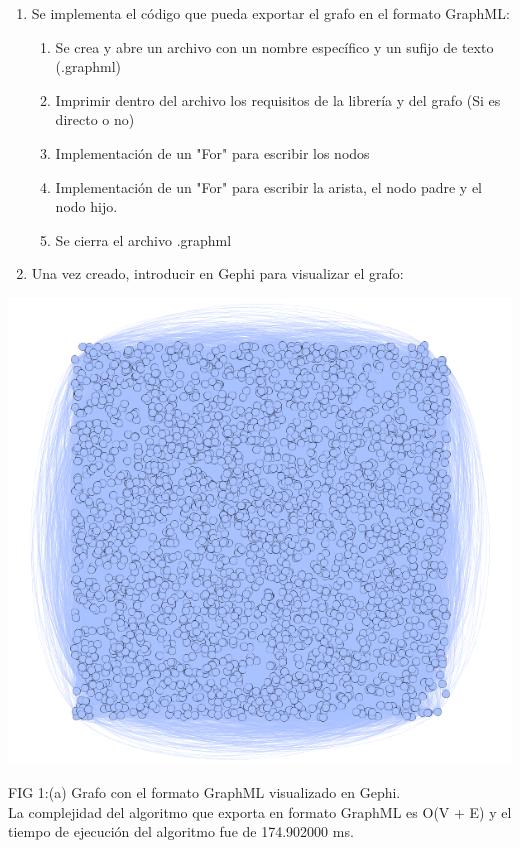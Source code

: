 \documentclass[book, 16 pt, conference]{ieeeconf}
\begin{document}
\begin{enumerate}
\item Se implementa el código que pueda exportar el grafo en el formato GraphML:
	\begin{enumerate}
	\item Se crea y abre un archivo con un nombre específico y un sufijo de texto (.graphml)
	\item Imprimir dentro del archivo los requisitos de la librería y del grafo (Si es directo o no)
	\item Implementación de un "For" para escribir los nodos
	\item Implementación de un "For" para escribir la arista, el nodo padre y el nodo hijo.
	\item Se cierra el archivo .graphml
	\end{enumerate}
\item Una vez creado, introducir en Gephi para visualizar el grafo: \\
\end{enumerate} 

\begin{center}
\includegraphics[scale=0.30]{1} 
\end{center}
FIG 1:(a) Grafo con el formato GraphML visualizado en Gephi.\\

La complejidad del algoritmo que exporta en formato GraphML es O(V + E) y el tiempo de ejecución del algoritmo fue de 174.902000 ms.
\end{document}
